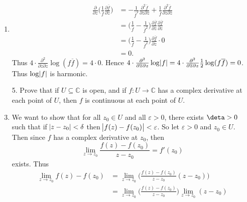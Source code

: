 \documentclass[12pt]{article}
\makeatletter
\theoremstyle{definition}
\theoremstyle{remark}
\renewenvironment{proof}[1][\proofname]{\par
  \pushQED{\qed}%
  \normalfont \topsep6\p@\@plus6\p@\relax
  \list{}{\leftmargin=0mm
          \rightmargin=4mm
          \settowidth{\itemindent}{\itshape#1}%
          \labelwidth=\itemindent
          \parsep=0pt \listparindent=\parindent 
  }
  \item[\hskip\labelsep
        \itshape
    #1\@addpunct{.}]\ignorespaces
}{%
  \popQED\endlist\@endpefalse
}
\let\oldproofname=\proofname
\renewcommand{\proofname}{\bf{\textit{\oldproofname}}}
\makeatother
\begin{document}
\begin{enumerate}[leftmargin=*]
\begin{proof}
\begin{equation*}
\begin{split}
                            \frac{\partial}{\partial z}\bigg(\frac{1}{\overline{f}}\frac{\partial\overline{f}}{\partial\overline{z}}\bigg)&=-\frac{1}{\overline{f}^2}\frac{\partial^2\overline{f}}{\partial z\partial\overline{z}}+\frac{1}{\overline{f}}\frac{\partial^2\overline{f}}{\partial z\partial\overline{z}} \\
                            &=\bigg(\frac{1}{\overline{f}}-\frac{1}{\overline{f}^2}\bigg)\frac{\partial\overline{f}}{\partial\overline{z}}\frac{\partial\overline{f}}{\partial z} \\
                            &=\bigg(\frac{1}{\overline{f}}-\frac{1}{\overline{f}^2}\bigg)\frac{\partial\overline{f}}{\partial\overline{z}}\cdot 0\\
                            &=0.
                        \end{split}
                    \end{equation*}
                Thus $4\cdot\frac{\partial^2}{\partial\overline{z}\partial z}\log(f\overline{f})=4\cdot 0$. Hence $4\cdot\frac{\partial^2}{\partial\overline{z}\partial z}\log\abs{f}=4\cdot\frac{\partial^2}{\partial\overline{z}\partial z}\frac{1}{2}\log(f\overline{f})=0$. Thus $\log\abs{f}$ is harmonic.
            \end{proof}\newpage
        \item[5.] Prove that if $U\subseteq\mathbb{C}$ is open, and if $f\colon U\rightarrow\mathbb{C}$ has a complex derivative at each point of $U$, then $f$ is continuous at each point of $U$. 
            \begin{proof}
                We want to show that for all $z_0\in U$ and all $\varepsilon>0$, there exists $\deta>0$ such that if $\abs{z-z_0}<\delta$ then $\abs{f(z)-f(z_0)}<\varepsilon$. So let $\varepsilon>0$ and $z_0\in U$. Then since $f$ has a complex derivative at $z_0$, then 
                    \begin{equation*}
                        \lim_{z\rightarrow z_0}\frac{f(z)-f(z_0)}{z-z_0}=f'(z_0)
                    \end{equation*}
                exists. Thus 
                    \begin{equation*}
                        \begin{split}
                            \lim_{z\rightarrow z_0}f(z)-f(z_0)&=\lim_{z\rightarrow z_0}\bigg(\frac{f(z)-f(z_0)}{z-z_0}(z-z_0)\bigg)\\
                            &=\lim_{z\rightarrow z_0}\bigg(\frac{f(z)-f(z_0)}{z-z_0}\bigg)\lim_{z\rightarrow z_0}(z-z_0) \\

\end{split}
\end{equation*}
\end{proof}
\end{enumerate}
\end{document}
